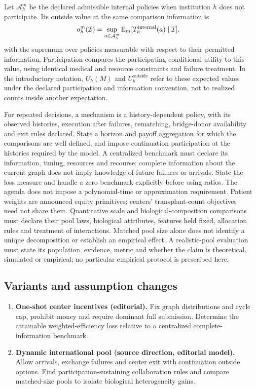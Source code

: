 \documentclass[11pt,a4paper]{article}
\begin{document}
Let \(\mathcal A_h^m\) be the declared admissible internal policies when institution \(h\) does not participate. Its outside value at the same comparison information is
\[
 o_h^m(\mathcal I)=\sup_{a\in\mathcal A_h^m}\mathbb E_m[T_h^{\rm internal}(a)\mid\mathcal I],
\]
with the supremum over policies measurable with respect to their permitted information. Participation compares the participating conditional utility to this value, using identical medical and resource constraints and failure treatment. In the introductory notation, \(U_h(M)\) and \(U_h^{\mathrm{outside}}\) refer to these expected values under the declared participation and information convention, not to realized counts inside another expectation.

For repeated decisions, a mechanism is a history-dependent policy, with its observed histories, execution after failures, rematching, bridge-donor availability and exit rules declared. State a horizon and payoff aggregation for which the comparisons are well defined, and impose continuation participation at the histories required by the model. A centralized benchmark must declare its information, timing, resources and recourse; complete information about the current graph does not imply knowledge of future failures or arrivals. State the loss measure and handle a zero benchmark explicitly before using ratios. The agenda does not impose a polynomial-time or approximation requirement. Patient weights are announced equity primitives; centers' transplant-count objectives need not share them. Quantitative scale and biological-composition comparisons must declare their pool laws, biological attributes, features held fixed, allocation rules and treatment of interactions. Matched pool size alone does not identify a unique decomposition or establish an empirical effect. A realistic-pool evaluation must state its population, evidence, metric and whether the claim is theoretical, simulated or empirical; no particular empirical protocol is prescribed here.
\subsection*{Variants and assumption changes}
\begin{enumerate}
\item \textbf{One-shot center incentives (editorial).} Fix graph distributions and cycle cap, prohibit money and require dominant full submission. Determine the attainable weighted-efficiency loss relative to a centralized complete-information benchmark.
\item \textbf{Dynamic international pool (source direction, editorial model).} Allow arrivals, exchange failures and center exit with continuation outside options. Find participation-sustaining collaboration rules and compare matched-size pools to isolate biological heterogeneity gains.
\end{enumerate}
\end{document}
